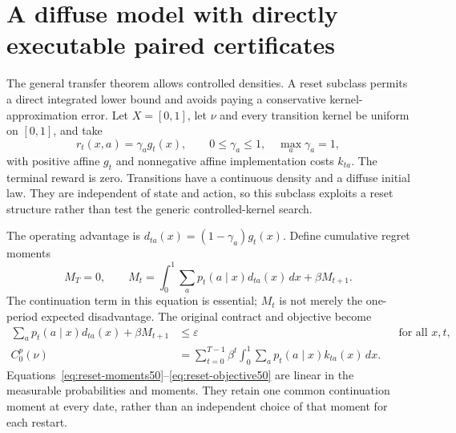\section{A diffuse model with directly executable paired certificates}\label{sec:reset50}
The general transfer theorem allows controlled densities. A reset subclass permits a direct integrated lower bound and avoids paying a conservative kernel-approximation error. Let $X=[0,1]$, let $\nu$ and every transition kernel be uniform on $[0,1]$, and take
\[
 r_t(x,a)=\gamma_a g_t(x),\qquad 0\le\gamma_a\le1,
 \quad\max_a\gamma_a=1,
\]
with positive affine $g_t$ and nonnegative affine implementation costs $k_{ta}$. The terminal reward is zero. Transitions have a continuous density and a diffuse initial law. They are independent of state and action, so this subclass exploits a reset structure rather than test the generic controlled-kernel search.

The operating advantage is $d_{ta}(x)=(1-\gamma_a)g_t(x)$. Define cumulative regret moments
\begin{equation}\label{eq:reset-moments50}
 M_T=0,\qquad
 M_t=\int_0^1\sum_a p_t(a\mid x)d_{ta}(x)\,dx+\beta M_{t+1}.
\end{equation}
The continuation term in this equation is essential; $M_t$ is not merely the one-period expected disadvantage. The original contract and objective become
\begin{align}
 \sum_a p_t(a\mid x)d_{ta}(x)+\beta M_{t+1}&\le\varepsilon
 &&\text{for all }x,t,\label{eq:reset-contract50}\\
 C_0^p(\nu)&=\sum_{t=0}^{T-1}\beta^t\int_0^1\sum_a p_t(a\mid x)k_{ta}(x)\,dx.\label{eq:reset-objective50}
\end{align}
Equations~\eqref{eq:reset-moments50}--\eqref{eq:reset-objective50} are linear in the measurable probabilities and moments. They retain one common continuation moment at every date, rather than an independent choice of that moment for each restart.

